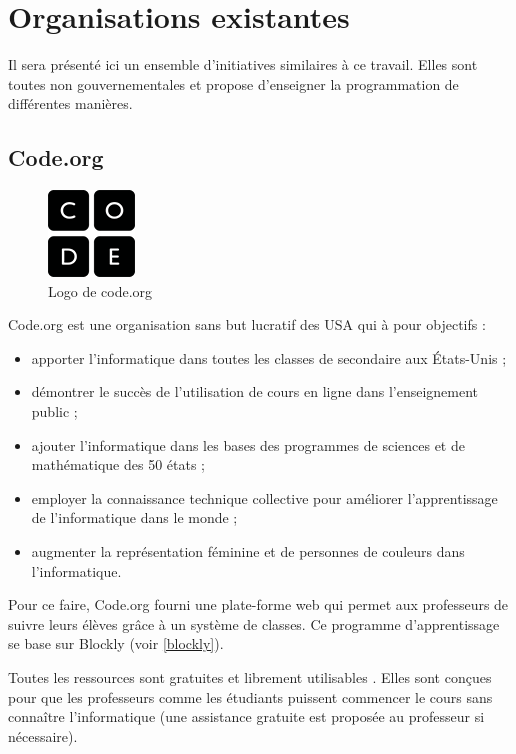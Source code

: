 \section{Organisations existantes}
Il sera présenté ici un ensemble d'initiatives similaires à ce travail. Elles sont toutes non gouvernementales et propose d'enseigner la programmation de différentes manières.
\subsection{Code.org}
\begin{figure}[!ht]
  \begin{center}
    \includegraphics[scale=0.5]{content/5-related_work/images/code}
    \caption{Logo de code.org}
    \label{fig:code.org}
  \end{center}
\end{figure}
Code.org \cite{code-org-about} est une organisation sans but lucratif des USA qui à pour objectifs :
\begin{itemize}
  \item apporter l'informatique dans toutes les classes de secondaire aux États-Unis ;
  \item démontrer le succès de l'utilisation de cours en ligne dans l'enseignement public ;
  \item ajouter l'informatique dans les bases des programmes de sciences et de mathématique des 50 états ;
  \item employer la connaissance technique collective pour améliorer l'apprentissage de l'informatique dans le monde ;
  \item augmenter la représentation féminine et de personnes de couleurs dans l'informatique.
\end{itemize}

Pour ce faire, Code.org fourni une plate-forme \cite{code-org-20hr} web qui permet aux professeurs de suivre leurs élèves grâce à un système de classes. Ce programme d'apprentissage se base sur Blockly (voir \ref{blockly}).

Toutes les ressources sont gratuites et librement utilisables \cite{code-org-faq}. Elles sont conçues pour que les professeurs comme les étudiants puissent commencer le cours sans connaître l'informatique (une assistance gratuite est proposée au professeur si nécessaire).

